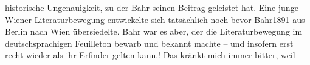 {{{                  historische Ungenauigkeit, zu der Bahr
                  seinen Beitrag geleistet hat. Eine junge Wiener
                  Literaturbewegung entwickelte sich tatsächlich noch bevor Bahr1891 aus Berlin nach
                     Wien übersiedelte. Bahr war es aber, der die Literaturbewegung im
                  deutschsprachigen Feuilleton bewarb und bekannt machte – und insofern erst recht
                  wieder als ihr Erfinder gelten kann.}}}\label{K_L02792-22}! Das kränkt mich immer bitter, weil
